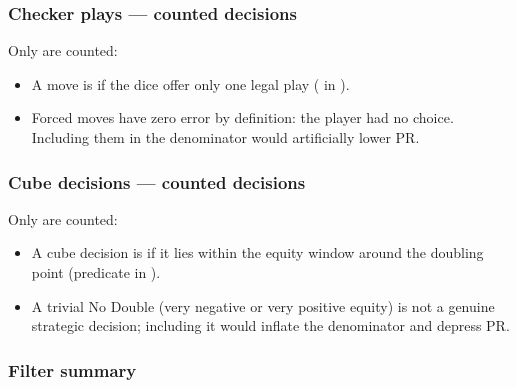 \documentclass[letterpaper,10pt,english]{sphinxmanual}
\begin{document}
\subsubsection{Checker plays — counted decisions}
\label{\detokenize{stats_parity:coups-de-pions-decisions-comptees}}
\sphinxAtStartPar
Only  are counted:
\begin{itemize}
\item {} 
\sphinxAtStartPar
A move is  if the dice offer only one legal play ( in ).

\item {} 
\sphinxAtStartPar
Forced moves have zero error by definition: the player had no choice. Including them in the denominator would artificially lower PR.

\end{itemize}


\subsubsection{Cube decisions — counted decisions}
\label{\detokenize{stats_parity:decisions-de-cube-decisions-comptees}}
\sphinxAtStartPar
Only  are counted:
\begin{itemize}
\item {} 
\sphinxAtStartPar
A cube decision is  if it lies within the equity window \sphinxcode{\sphinxupquote{{[}\sphinxhyphen{}0.16, +0.16{]}}} around the doubling point (predicate  in ).

\item {} 
\sphinxAtStartPar
A trivial No Double (very negative or very positive equity) is not a genuine strategic decision; including it would inflate the denominator and depress PR.

\end{itemize}


\subsubsection{Filter summary}
\label{\detokenize{stats_parity:resume-du-filtre}}
\end{document}

